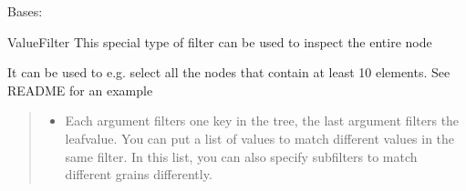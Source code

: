\documentclass[a4paper,10pt,english]{sphinxmanual}
\begin{document}

\begin{fulllineitems}
\label{\detokenize{fagus.filters:fagus.filters.VFil}}
\pysigstartsignatures
{}
\pysigstopsignatures
\sphinxAtStartPar
Bases: {\hyperref[\detokenize{fagus.filters:fagus.filters.FilBase}]{}}

\sphinxAtStartPar
ValueFilter \sphinxhyphen{} This special type of filter can be used to inspect the entire node

\sphinxAtStartPar
It can be used to e.g. select all the nodes that contain at least 10 elements. See README for an example

\begin{fulllineitems}
\label{\detokenize{fagus.filters:fagus.filters.VFil.__init__}}
\pysigstartsignatures
{}
\pysigstopsignatures\begin{quote}\begin{description}
\begin{itemize}
\item {}
\sphinxAtStartPar
{} \textendash{} Each argument filters one key in the tree, the last argument filters the leaf\sphinxhyphen{}value. You can
put a list of values to match different values in the same filter. In this list, you can also specify
subfilters to match different grains differently.


\end{itemize}
\end{description}
\end{quote}
\end{fulllineitems}
\end{fulllineitems}
\end{document}
